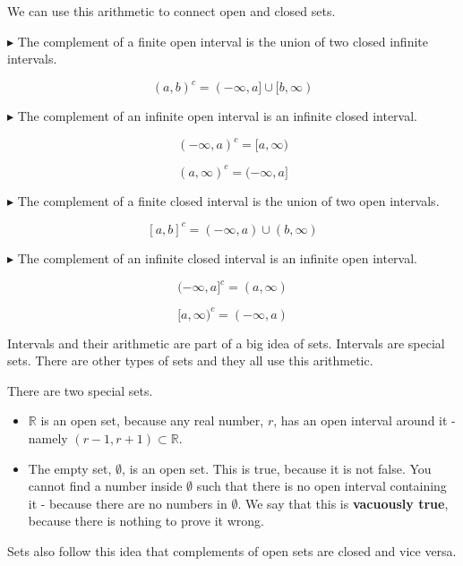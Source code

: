 \documentclass{ximera}
\begin{document}
We can use this arithmetic to connect open and closed sets.

$\blacktriangleright$ The complement of a finite open interval is the union of two closed infinite intervals.

\[    (a,b)^{c}  = (-\infty, a] \cup [b, \infty)          \]



$\blacktriangleright$ The complement of an infinite open interval is an infinite closed interval.

\[     (-\infty, a)^{c} = [a, \infty)          \]

\[     (a, \infty)^{c} = (-\infty, a]          \]



$\blacktriangleright$ The complement of a finite closed interval is the union of two open intervals.

\[    [a,b]^{c}  = (-\infty, a) \cup (b, \infty)          \]



$\blacktriangleright$ The complement of an infinite closed interval is an infinite open interval.

\[     (-\infty, a]^{c} = (a, \infty)          \]

\[     [a, \infty)^{c} = (-\infty, a)          \]









Intervals and their arithmetic are part of a big idea of sets.  Intervals are special sets.  There are other types of sets and they all use this arithmetic.

There are two special sets.

\begin{itemize}
\item $\mathbb{R}$  is an open set, because any real number, $r$, has an open interval around it - namely $(r-1, r+1) \subset \mathbb{R}$.
\item The empty set, $\emptyset$, is an open set.  This is true, because it is not false.  You cannot find a number inside $\emptyset$ such that there is no open interval containing it - because there are no numbers in $\emptyset$.  We say that this is \textbf{vacuously true}, because there is nothing to prove it wrong.
\end{itemize}





Sets also follow this idea that complements of open sets are closed and vice versa.
\end{document}
